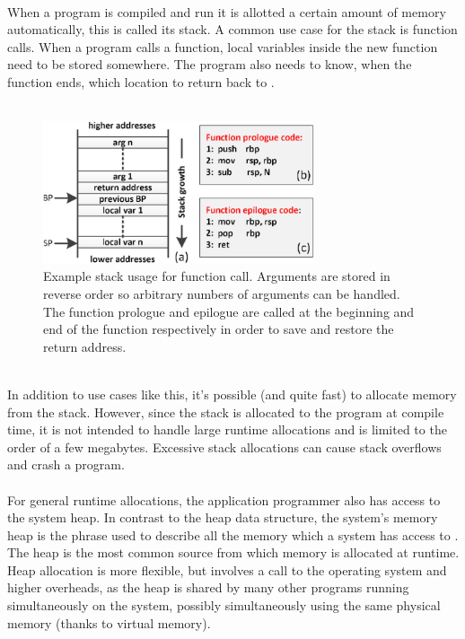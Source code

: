 \documentclass{article}
\begin{document}
\pagebreak
\\
When a program is compiled and run it is allotted a certain amount of memory automatically, this is called its stack. A common use case for the stack is function calls. When a program calls a function, local variables inside the new function need to be stored somewhere. The program also needs to know, when the function ends, which location to return back to \cite{10.5555/202036}.\\
\\
\begin{figure}[h]
	\centering
	\includegraphics[width=8cm]{stack_frame}
	\captionsetup{width=10cm}
	\caption{Example stack usage for function call. Arguments are stored in reverse order so arbitrary numbers of arguments can be handled. The function prologue and epilogue are called at the beginning and end of the function respectively in order to save and restore the return address. \cite{stackFrame}}
\end{figure}
\\
In addition to use cases like this,  it's possible (and quite fast) to allocate memory from the stack. However, since the stack is allocated to  the program at compile time, it is not intended to handle large runtime allocations and is limited to the order of a few megabytes. Excessive stack allocations can cause stack overflows and crash a program.\\
\\
For general runtime allocations, the application programmer also has access to the system heap. In contrast to the heap data structure, the system's memory heap is the phrase used to describe all the memory which a system has access to \cite{knuth97}. The heap is the most common source from which memory is allocated at runtime. Heap allocation is more flexible, but involves a call to the operating system and higher overheads, as the heap is shared by many other programs running simultaneously on the system, possibly simultaneously using the same physical memory (thanks to virtual memory).\\
\\
\end{document}
